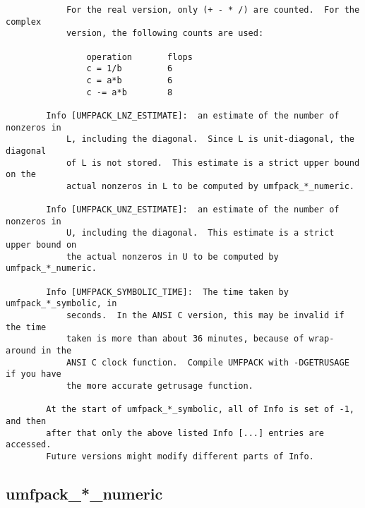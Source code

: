 {\begin{verbatim}
            For the real version, only (+ - * /) are counted.  For the complex
            version, the following counts are used:

                operation       flops
                c = 1/b         6
                c = a*b         6
                c -= a*b        8

        Info [UMFPACK_LNZ_ESTIMATE]:  an estimate of the number of nonzeros in
            L, including the diagonal.  Since L is unit-diagonal, the diagonal
            of L is not stored.  This estimate is a strict upper bound on the
            actual nonzeros in L to be computed by umfpack_*_numeric.

        Info [UMFPACK_UNZ_ESTIMATE]:  an estimate of the number of nonzeros in
            U, including the diagonal.  This estimate is a strict upper bound on
            the actual nonzeros in U to be computed by umfpack_*_numeric.

        Info [UMFPACK_SYMBOLIC_TIME]:  The time taken by umfpack_*_symbolic, in
            seconds.  In the ANSI C version, this may be invalid if the time
            taken is more than about 36 minutes, because of wrap-around in the
            ANSI C clock function.  Compile UMFPACK with -DGETRUSAGE if you have
            the more accurate getrusage function.

        At the start of umfpack_*_symbolic, all of Info is set of -1, and then
        after that only the above listed Info [...] entries are accessed.
        Future versions might modify different parts of Info.
\end{verbatim}
}

\newpage
\subsection{umfpack\_*\_numeric}

